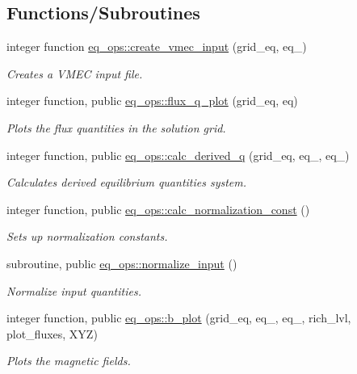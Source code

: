 \subsection*{Functions/\+Subroutines}
\begin{DoxyCompactItemize}
\item 
integer function \hyperlink{namespaceeq__ops_a9addef683b3d4a8c587510e4c994ec61}{eq\+\_\+ops\+::create\+\_\+vmec\+\_\+input} (grid\+\_\+eq, eq\+\_)
\begin{DoxyCompactList}\small\item\em Creates a V\+M\+EC input file. \end{DoxyCompactList}\item 
integer function, public \hyperlink{namespaceeq__ops_abe0074f8c386b52f685352666a822eb8}{eq\+\_\+ops\+::flux\+\_\+q\+\_\+plot} (grid\+\_\+eq, eq)
\begin{DoxyCompactList}\small\item\em Plots the flux quantities in the solution grid. \end{DoxyCompactList}\item 
integer function, public \hyperlink{namespaceeq__ops_a9b09b324fb953fb6bf92cda7731b0f1c}{eq\+\_\+ops\+::calc\+\_\+derived\+\_\+q} (grid\+\_\+eq, eq\+\_, eq\+\_)
\begin{DoxyCompactList}\small\item\em Calculates derived equilibrium quantities system. \end{DoxyCompactList}\item 
integer function, public \hyperlink{namespaceeq__ops_a0f755ba26015cd542aa3209dcb80013d}{eq\+\_\+ops\+::calc\+\_\+normalization\+\_\+const} ()
\begin{DoxyCompactList}\small\item\em Sets up normalization constants. \end{DoxyCompactList}\item 
subroutine, public \hyperlink{namespaceeq__ops_a99eda092b39e3afe8ad14f9916f60d1d}{eq\+\_\+ops\+::normalize\+\_\+input} ()
\begin{DoxyCompactList}\small\item\em Normalize input quantities. \end{DoxyCompactList}\item 
integer function, public \hyperlink{namespaceeq__ops_a5591339a686f1c8591c4b43f40b15065}{eq\+\_\+ops\+::b\+\_\+plot} (grid\+\_\+eq, eq\+\_, eq\+\_, rich\+\_\+lvl, plot\+\_\+fluxes, X\+YZ)
\begin{DoxyCompactList}\small\item\em Plots the magnetic fields. \end{DoxyCompactList}\item 

\end{DoxyCompactItemize}
